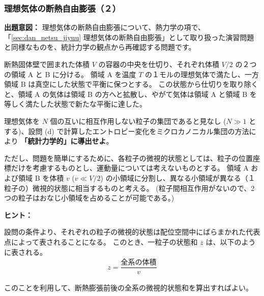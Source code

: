 \documentclass[uplatex,dvipdfmx,a4paper,11pt]{jsarticle}
\begin{document}
\newpage

\subsubsection{理想気体の断熱自由膨張（２）}
\label{sec:dan_netsu_toukei}

\begin{boxnote}
{\bf 出題意図：}
理想気体の断熱自由膨張について、熱力学の項で、「\ref{sec:dan_netsu_jiyuu} 理想気体の断熱自由膨張」として取り扱った演習問題と同様なものを、統計力学の観点から再確認する問題です。
\end{boxnote}
\vspace{8pt}

断熱固体壁で囲まれた体積 $V$ の容器の中央を仕切り、それぞれ体積 $V/2$ の２つの領域 A と B に分ける。
領域 A を温度 $T$ の１モルの理想気体で満たし、一方領域 B は真空にした状態で平衡に保つとする。
この状態から仕切りを取り除くと、領域 A の気体は領域 B の方へと拡散し、やがて気体は領域 A と領域 B を等しく満たした状態で新たな平衡に達した。


理想気体を $N$ 個の互いに相互作用しない粒子の集団であると見なし ($N \gg 1$ とする)、設問 (d) で計算したエントロピー変化をミクロカノニカル集団の方法により {\bf 「統計力学的」に導出せよ}。

ただし、問題を簡単にするために、各粒子の微視的状態としては、粒子の位置座標だけを考慮するものとし、運動量については考えないものとする。
領域 A および領域 B を体積 $v$ ($v \ll V/2$) の小領域に分割し、異なる小領域が異なる（１粒子の）微視的状態に相当するものと考える。
(粒子間相互作用がないので、2つの粒子はおなじ小領域を占めることが可能である。)

\begin{itembox}[l]{{\bf ヒント：}}

設問の条件より、それぞれの粒子の微視的状態は配位空間中にばらまかれた代表点によって表されることになる。
このとき、一粒子の状態和 $z$ は、以下のように表される。
\begin{align*}
z = \dfrac{\text{全系の体積}}{v}
\end{align*}

このことを利用して、断熱膨張前後の全系の微視的状態和を算出すればよい。

\end{itembox}

\color{black}
\end{document}
